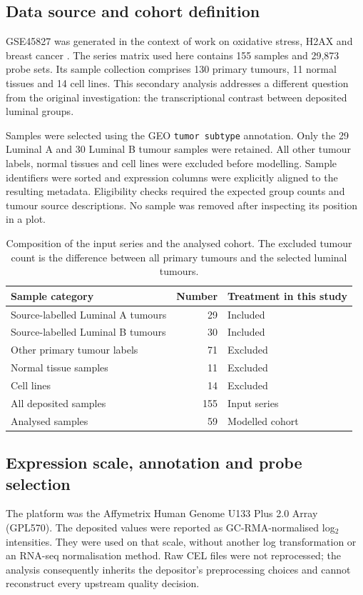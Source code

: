 \documentclass[11pt,a4paper]{article}
\begin{document}
\subsection{Data source and cohort definition}
GSE45827 was generated in the context of work on oxidative stress, H2AX and breast cancer \cite{Gruosso2016,GEO}. The series matrix used here contains 155 samples and 29,873 probe sets. Its sample collection comprises 130 primary tumours, 11 normal tissues and 14 cell lines. This secondary analysis addresses a different question from the original investigation: the transcriptional contrast between deposited luminal groups.

Samples were selected using the GEO \texttt{tumor subtype} annotation. Only the 29 Luminal A and 30 Luminal B tumour samples were retained. All other tumour labels, normal tissues and cell lines were excluded before modelling. Sample identifiers were sorted and expression columns were explicitly aligned to the resulting metadata. Eligibility checks required the expected group counts and tumour source descriptions. No sample was removed after inspecting its position in a plot.

\begin{table}[!htbp]
\centering
\caption{Composition of the input series and the analysed cohort. The excluded tumour count is the difference between all primary tumours and the selected luminal tumours.}
\label{tab:cohort}
\begin{tabularx}{\linewidth}{@{}Xrl@{}}\toprule
Sample category & Number & Treatment in this study\\\midrule
Source-labelled Luminal A tumours & 29 & Included\\
Source-labelled Luminal B tumours & 30 & Included\\
Other primary tumour labels & 71 & Excluded\\
Normal tissue samples & 11 & Excluded\\
Cell lines & 14 & Excluded\\\midrule
All deposited samples & 155 & Input series\\
Analysed samples & 59 & Modelled cohort\\\bottomrule
\end{tabularx}
\end{table}

\subsection{Expression scale, annotation and probe selection}
The platform was the Affymetrix Human Genome U133 Plus 2.0 Array (GPL570). The deposited values were reported as GC-RMA-normalised log$_2$ intensities. They were used on that scale, without another log transformation or an RNA-seq normalisation method. Raw CEL files were not reprocessed; the analysis consequently inherits the depositor's preprocessing choices and cannot reconstruct every upstream quality decision.
\end{document}
